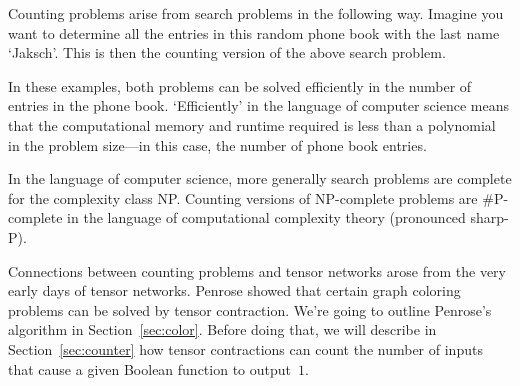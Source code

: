 \documentclass[aps,pra,12pt,nofootinbib,superscriptaddress,longbibliography]{revtex4-1}
\newcommand{\vb}[1]{}
\theoremstyle{plain}
\theoremstyle{definition}
\newcommand{\be}{\begin{equation}}
\newcommand{\ee}{\end{equation}}
\begin{document}
Counting problems arise from search problems in the following way.  Imagine you want to determine all the entries in this random phone book with the last name `Jaksch'.  This is then the counting version of the above search problem.  

In these examples, both problems can be solved efficiently in the number of entries in the phone book.  `Efficiently' in the language of computer science means that the computational memory and runtime required is less than a polynomial in the problem size---in this case, the number of phone book entries.  

In the language of computer science, more generally search problems are complete for the complexity class {\sf NP}.  Counting versions of {\sf NP}-complete problems are {\sf \#P}-complete \cite{valiant1979complexity2} in the language of computational complexity theory (pronounced sharp-P). 
 

\begin{comment}
Perhaps our phone book example seemed a bit contrived.  It turns out however that many problems in physics, material science, chemistry and beyond can be stated as instances of counting problems.  A tantamount physical example arises from calculating the partition function $\mathcal Z$ of a physical system at inverse temperature $\beta$. 
\be
{\mathcal Z}:= \text{tr}\{e^{-\beta {\mathcal L}}\}:=\langle e^{-\beta {\mathcal L}}\rangle
\ee 
where the brackets correspond to the matrix trace and ${\mathcal L}$ is the so called, Hamiltonian---a hermitian matrix.  The connection to counting is not immediately seen---though the trace of a matrix is a sum of the diagonal entries. Say we assume that the diagonal entries of ${\mathcal L}$ take only values in the set $\{0,1\}$.  The negative of the derivative with respect to $\beta$, evaluated at $\beta=0$ recovers simply $\text{tr}\{{\mathcal L}\}$, which counts the number of $1$'s. 
\be 
- \partial_\beta {\mathcal Z}(\beta)\bigg|_{\beta=0}  = -\langle -{\mathcal L}  e^{-\beta {\mathcal L}} \rangle\bigg|_{\beta=0} = \text{tr}\{{\mathcal L}\} 
\ee
Implying that the partition function contains at least as much information as given by the counting problem.  
\end{comment}

Connections between counting problems and tensor networks arose from the very early days of tensor networks.
Penrose showed \cite{Penrose} that certain graph coloring problems can be solved by tensor contraction.
We're going to outline Penrose's algorithm in Section~\ref{sec:color}.
Before doing that, we will describe in Section~\ref{sec:counter} how tensor contractions can count the number of inputs that cause a given Boolean function to output~$1$.
\end{document}
